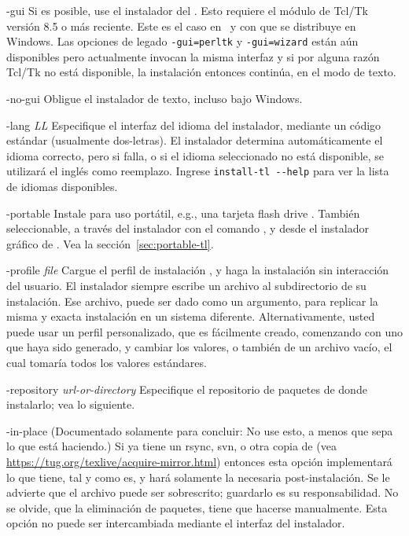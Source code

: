 \documentclass{article}
\begin{document}
\begin{ttdescription}
\item[-gui] Si es posible, use el instalador del \GUI{}. Esto requiere
		el módulo de Tcl/Tk versión 8.5 o más reciente.  Este es el
		caso en \MacOSX\ y con \TL{} que se distribuye en Windows.  Las
		opciones de legado \texttt{-gui=perltk} y \texttt{-gui=wizard}
		están aún disponibles pero actualmente invocan la misma interfaz \GUI{} y si por alguna razón Tcl/Tk no está disponible, la instalación entonces continúa, en el modo de texto. 

\item[-no-gui] Obligue el instalador de texto, incluso bajo Windows. 

\item[-lang {\sl LL}] Especifique el interfaz del idioma del
	instalador, mediante un código estándar (usualmente
	dos-letras). El instalador determina automáticamente el idioma
	correcto, pero si falla, o si el idioma seleccionado no está
	disponible, se utilizará el inglés como reemplazo. Ingrese
	\verb|install-tl --help| para ver la lista de idiomas
	disponibles.

\item[-portable] Instale para uso portátil, e.g., una tarjeta flash
	drive \USB{}. También seleccionable, a través del instalador
	con el comando , y desde el instalador gráfico de
	\GUI{}. Vea la sección~\ref{sec:portable-tl}.

\item[-profile {\sl file}] Cargue el perfil de instalación ,
	y haga la instalación sin interacción del usuario. El
	instalador siempre escribe un archivo
	 al subdirectorio  de
	su instalación. Ese archivo, puede ser dado como un argumento,
	para replicar la misma y exacta instalación en un sistema
	diferente. Alternativamente, usted puede usar un perfil
	personalizado, que es fácilmente creado, comenzando con uno
	que haya sido generado, y cambiar los valores, o también de un
	archivo vacío, el cual tomaría todos los valores estándares.

\item[-repository {\sl url-or-directory}] Especifique el repositorio
	de paquetes de donde instalarlo; vea lo siguiente.


\item[-in-place] (Documentado solamente para concluir: No use esto, a
	menos que sepa lo que está haciendo.) Si ya tiene un rsync,
	svn, o otra copia de \TL{} (vea
	\url{https://tug.org/texlive/acquire-mirror.html}) entonces
	esta opción implementará lo que tiene, tal y como es, y hará
	solamente la necesaria post-instalación. Se le advierte que el
	archivo  puede ser sobrescrito;
	guardarlo es su responsabilidad. No se olvide, que la
	eliminación de paquetes, tiene que hacerse manualmente. Esta
	opción no puede ser intercambiada mediante el interfaz del
	instalador. 
\end{ttdescription}
\end{document}
